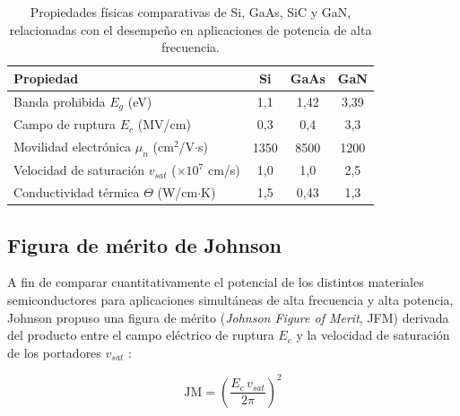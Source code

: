 \begin{table}[H]
    \centering
    \caption{Propiedades físicas comparativas de Si, GaAs, SiC y GaN, relacionadas con el desempeño en aplicaciones de potencia de alta frecuencia.}
    \label{tab:material_comparison}
    \begin{tabular}{lccc}
        \hline
        \textbf{Propiedad}                                     & \textbf{Si} & \textbf{GaAs} & \textbf{GaN} \\
        \hline
        Banda prohibida $E_g$ (eV)                             & 1{,}1       & 1{,}42        & 3{,}39       \\
        Campo de ruptura $E_c$ (MV/cm)                         & 0{,}3       & 0{,}4         & 3{,}3        \\
        Movilidad electrónica $\mu_n$ (cm$^{2}$/V$\cdot$s)     & 1350        & 8500          & 1200         \\
        Velocidad de saturación $v_{sat}$ ($\times 10^7$ cm/s) & 1{,}0       & 1{,}0         & 2{,}5        \\
        Conductividad térmica $\Theta$ (W/cm$\cdot$K)          & 1{,}5       & 0{,}43        & 1{,}3        \\
        \hline
    \end{tabular}
\end{table}

\subsection{Figura de mérito de Johnson}
A fin de comparar cuantitativamente el potencial de los distintos materiales semiconductores para aplicaciones simultáneas de alta frecuencia y alta potencia, Johnson propuso una figura de mérito (\textit{Johnson Figure of Merit}, JFM) derivada del producto entre el campo eléctrico de ruptura $E_c$ y la velocidad de saturación de los portadores $v_{sat}$ \cite{johnson1965}:

\begin{equation}
    \mathrm{JM} = \left( \frac{E_c \, v_{sat}}{2\pi} \right)^2
    \label{eq:jfm}
\end{equation}

